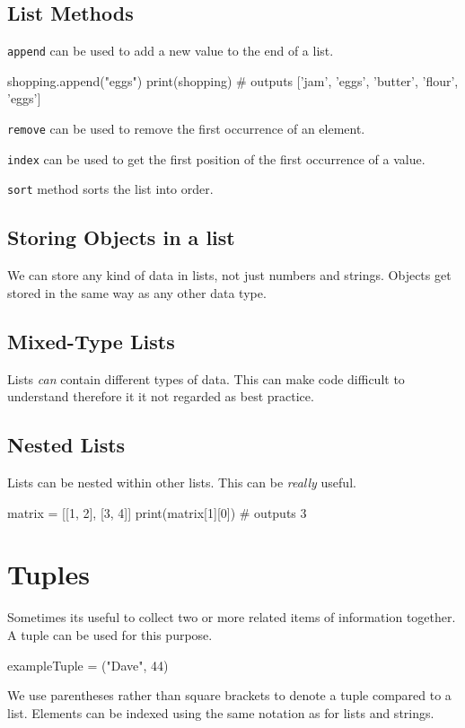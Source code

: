\subsection*{List Methods}
\verb|append| can be used to add a new value to the end of a list.
\begin{python}
shopping.append("eggs")
print(shopping)
# outputs ['jam', 'eggs', 'butter', 'flour', 'eggs']
\end{python}

\verb|remove| can be used to remove the first occurrence of an element. 

\verb|index| can be used to get the first position of the first occurrence of a value.

\verb|sort| method sorts the list into order.

\subsection*{Storing Objects in a list}
We can store any kind of data in lists, not just numbers and strings. Objects get stored in the same way as any other data type.

\subsection*{Mixed-Type Lists}
Lists \textit{can} contain different types of data. This can make code difficult to understand therefore it it not regarded as best practice. 

\subsection*{Nested Lists}
Lists can be nested within other lists. This can be \textit{really} useful.
\begin{python}
matrix = [[1, 2], [3, 4]]
print(matrix[1][0])  # outputs 3
\end{python}


\section*{Tuples}
Sometimes its useful to collect two or more related items of information together. A tuple can be used for this purpose.
\begin{python}
exampleTuple = ("Dave", 44)
\end{python}
We use parentheses rather than square brackets to denote a tuple compared to a list. Elements can be indexed using the same notation as for lists and strings.

